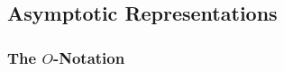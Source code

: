 \tasktodo

\tasktodo

\tasktodo

\tasktodo

\tasktodo

\tasktodo

\tasktodo

\tasktodo

\tasktodo

\tasktodo

\tasktodo

\tasktodo

\tasktodo

\tasktodo

\tasktodo

\tasktodo

\tasktodo

\tasktodo

\tasktodo

\tasktodo

\tasktodo

\subsection{Asymptotic Representations}

\subsubsection{The $O$-Notation}

\tasktodo

\tasktodo

\tasktodo

\tasktodo

\tasktodo

\tasktodo

\tasktodo

\tasktodo

\tasktodo

\tasktodo

\tasktodo

